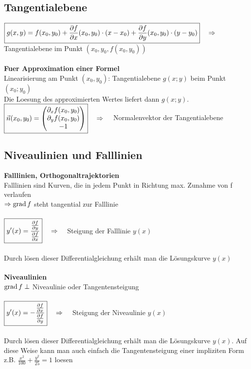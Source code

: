 \subsection{Tangentialebene}
$\boxed{g(x,y)=f(x_0,y_0)+\dfrac{\partial f}{\partial x}(x_0,y_0)\cdot(x-x_0)+\dfrac{\partial f}{\partial y}(x_0,y_0)\cdot(y-y_0)}
\quad \Rightarrow \quad$ Tangentialebene im Punkt $(x_0,y_0,f(x_0,y_0))$\\ \\
\textbf{Fuer Approximation einer Formel}\\
Linearisierung am Punkt $(x_0,y_0)$: Tangentialebene $g(x;y)$ beim Punkt
$(x_0;y_0)$\\
Die Loesung des approximierten Wertes liefert dann $g(x;y)$.\\

$\boxed{\vec{n}(x_0,y_0)=
\begin{pmatrix}
	\partial_{x} f(x_0,y_0)\\
	\partial_{y} f(x_0,y_0)\\
	-1\\                         
\end{pmatrix}} \quad \Rightarrow \quad$ Normalenvektor der Tangentialebene

\subsection{Niveaulinien und Falllinien}
\textbf{Falllinien, Orthogonaltrajektorien}\\
Falllinien sind Kurven, die in jedem Punkt in Richtung max. Zunahme von f
verlaufen\\
$\Rightarrow \operatorname{grad} f$ steht tangential zur Falllinie\\\\
$\boxed{y'(x)= \dfrac{\frac{\partial f}{\partial y}}{\frac{\partial f}{\partial x}}} \quad
\Rightarrow \quad$ Steigung der Falllinie $y(x)$\\\\
Durch lösen dieser Differentialgleichung erhält man
die Lösungskurve $y(x)$\\ \\
\textbf{Niveaulinien}\\
$\operatorname{grad} f \perp $ Niveaulinie oder Tangentensteigung\\\\
$\boxed{y'(x)=- \dfrac{\frac{\partial f}{\partial x}}{\frac{\partial f}{\partial y}}}\quad
\Rightarrow \quad$ Steigung der Niveaulinie $y(x)$\\\\
Durch lösen dieser Differentialgleichung erhält man
die Lösungskurve $y(x)$. Auf diese Weise kann man auch einfach die
Tangentensteigung einer impliziten Form z.B. $\frac{x^2}{100}+\frac{y^2}{25}=1$
loesen

